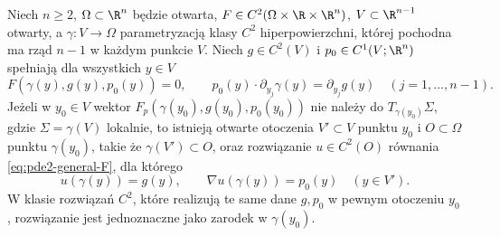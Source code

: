\begin{twierdzenie}
\label{thm:pde2-charpit}
Niech $n\geq2$, $\Omega\subset\R^n$ będzie otwarta,
$F\in C^2(\Omega\times\R\times\R^n)$,
$V\subset\R^{n-1}$ otwarty, a
$\gamma\colon V\to\Omega$ parametryzacją klasy $C^2$
hiperpowierzchni, której pochodna ma rząd $n-1$
w każdym punkcie $V$. Niech $g\in C^2(V)$ i
$p_0\in C^1(V;\R^n)$ spełniają dla wszystkich $y\in V$
\begin{equation}\label{eq:pde2-charpit-initial}
 F(\gamma(y),g(y),p_0(y))=0,\qquad
 p_0(y)\cdot\partial_{y_j}\gamma(y)=\partial_{y_j}g(y)
 \quad(j=1,\ldots,n-1).
\end{equation}
Jeżeli w $y_0\in V$ wektor
$F_p(\gamma(y_0),g(y_0),p_0(y_0))$
nie należy do $T_{\gamma(y_0)}\Sigma$,
gdzie $\Sigma=\gamma(V)$ lokalnie, to istnieją otwarte otoczenia $V'\subset V$ punktu $y_0$
i $O\subset\Omega$ punktu $\gamma(y_0)$, takie że
$\gamma(V')\subset O$, oraz rozwiązanie
$u\in C^2(O)$ równania \eqref{eq:pde2-general-F}, dla którego
\[
 u(\gamma(y))=g(y),\qquad \nabla u(\gamma(y))=p_0(y)
 \quad(y\in V').
\]
W klasie rozwiązań $C^2$, które realizują te same dane
$g,p_0$ w pewnym otoczeniu $y_0$, rozwiązanie jest
jednoznaczne jako zarodek w $\gamma(y_0)$.
\end{twierdzenie}
